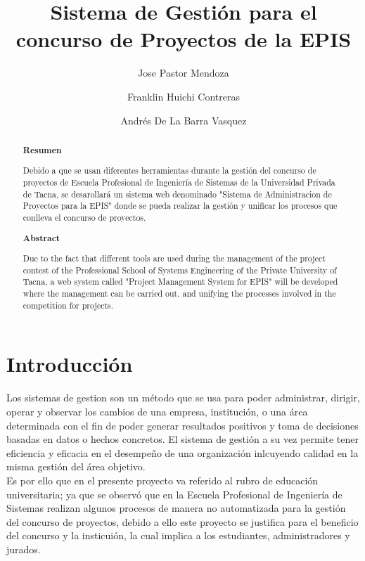 \documentclass[%
 reprint,
 amsmath,amssymb,
 aps,
]{revtex4-1}
\begin{document}
\title{Sistema de Gestión para el concurso de Proyectos de la EPIS}
\author{Jose Pastor Mendoza}
\author{Franklin Huichi Contreras}
\author{Andrés De La Barra Vasquez}
%

\begin{abstract}
\begin{center}
\textbf{Resumen}
\end{center}
Debido a que se usan diferentes herramientas durante la gestión del concurso de proyectos de Escuela Profesional de Ingeniería de Sistemas de la Universidad Privada de Tacna, se desarollará un sistema web denominado "Sistema de Administracion de Proyectos para la EPIS" donde se pueda realizar la gestión y unificar los procesos que conlleva el concurso de proyectos.


\begin{center}
\textbf{Abstract}
\end{center}
Due to the fact that different tools are used during the management of the project contest of the Professional School of Systems Engineering of the Private University of Tacna, a web system called "Project Management System for EPIS" will be developed where the management can be carried out. and unifying the processes involved in the competition for projects.

\end{abstract}



\maketitle


\section {Introducción}

Los sistemas de gestion son un método que se usa para poder administrar, dirigir, operar y observar los cambios de una empresa, institución, o una área determinada con el fin de poder generar resultados positivos y toma de decisiones basadas en datos o hechos concretos. El sistema de gestión a su vez permite tener eficiencia y eficacia en el desempeño de una organización inlcuyendo calidad en la misma gestión del área objetivo.\\
Es por ello que en el presente proyecto va referido al rubro de educación universitaria; ya que se observó que en la Escuela Profesional de Ingeniería de Sistemas realizan algunos procesos de manera no automatizada para la gestión del concurso de proyectos, debido a ello este proyecto se justifica para el beneficio del concurso y la insticuión, la cual implica a los estudiantes, administradores y jurados.
\end{document}
